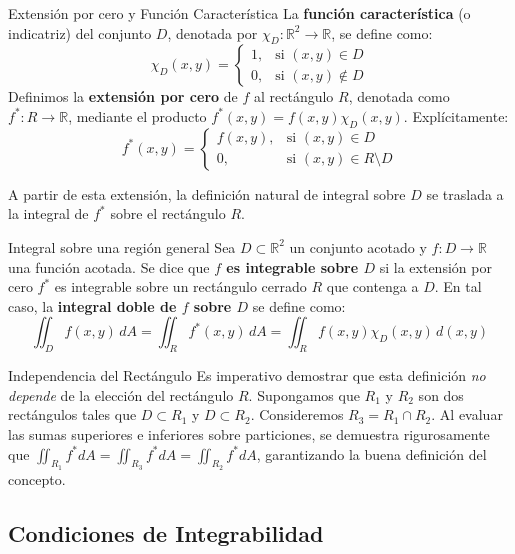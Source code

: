 \documentclass[11pt,a4paper]{article}
\begin{document}
\begin{definicionbox}{Extensión por cero y Función Característica}{}
    La \textbf{función característica} (o indicatriz) del conjunto $D$, denotada por $\chi_D : \mathbb{R}^2 \to \mathbb{R}$, se define como:
    \[
    \chi_D(x,y) = \begin{cases} 
    1, & \text{si } (x,y) \in D \\
    0, & \text{si } (x,y) \notin D 
    \end{cases}
    \]
    Definimos la \textbf{extensión por cero} de $f$ al rectángulo $R$, denotada como $f^* : R \to \mathbb{R}$, mediante el producto $f^*(x,y) = f(x,y)\chi_D(x,y)$. Explícitamente:
    \[
    f^*(x,y) = \begin{cases} 
    f(x,y), & \text{si } (x,y) \in D \\
    0, & \text{si } (x,y) \in R \setminus D 
    \end{cases}
    \]
\end{definicionbox}

A partir de esta extensión, la definición natural de integral sobre $D$ se traslada a la integral de $f^*$ sobre el rectángulo $R$.

\begin{definicionbox}{Integral sobre una región general}{}
    Sea $D \subset \mathbb{R}^2$ un conjunto acotado y $f: D \to \mathbb{R}$ una función acotada. Se dice que \textbf{$f$ es integrable sobre $D$} si la extensión por cero $f^*$ es integrable sobre un rectángulo cerrado $R$ que contenga a $D$. En tal caso, la \textbf{integral doble de $f$ sobre $D$} se define como:
    \[
    \iint_D f(x,y) \, dA = \iint_R f^*(x,y) \, dA = \iint_R f(x,y)\chi_D(x,y) \, d(x,y)
    \]
\end{definicionbox}

\begin{observacionbox}{Independencia del Rectángulo}
    Es imperativo demostrar que esta definición \textit{no depende} de la elección del rectángulo $R$. Supongamos que $R_1$ y $R_2$ son dos rectángulos tales que $D \subset R_1$ y $D \subset R_2$. Consideremos $R_3 = R_1 \cap R_2$. Al evaluar las sumas superiores e inferiores sobre particiones, se demuestra rigurosamente que $\iint_{R_1} f^* dA = \iint_{R_3} f^* dA = \iint_{R_2} f^* dA$, garantizando la buena definición del concepto.
\end{observacionbox}

\subsection{Condiciones de Integrabilidad}
\end{document}

